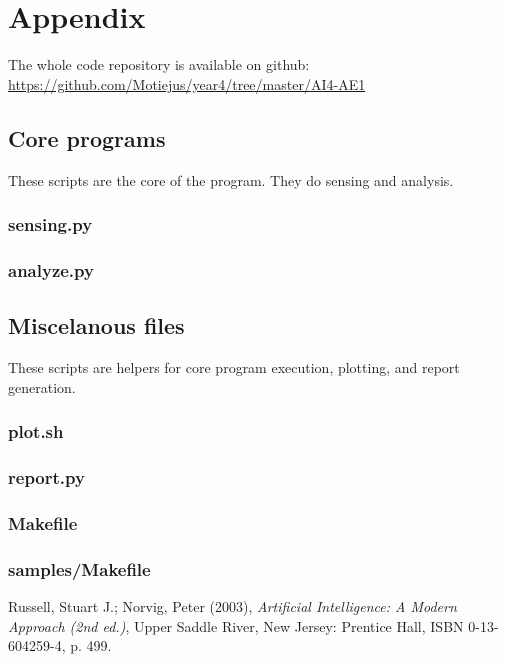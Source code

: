 \documentclass[english,11pt]{article}
\numberwithin{equation}{section}
\newcommand{\listing}[1]{
    \subsubsection{#1}
    {\small }
}
\begin{document}
\section{Appendix}

The whole code repository is available on github: \\
\url{https://github.com/Motiejus/year4/tree/master/AI4-AE1}

\subsection{Core programs}
These scripts are the core of the program. They do sensing and analysis.

\listing{sensing.py}
\listing{analyze.py}

\subsection{Miscelanous files}

These scripts are helpers for core program execution, plotting, and report
generation.

\listing{plot.sh}
\listing{report.py}
\listing{Makefile}
\listing{samples/Makefile}

\clearpage
\begin{thebibliography}{9}

        Russell, Stuart J.; Norvig, Peter (2003),
        \emph{Artificial Intelligence: A Modern Approach (2nd ed.)},
        Upper Saddle River, New Jersey: Prentice Hall,
        ISBN 0-13-604259-4, p. 499.

\end{thebibliography}
\end{document}
